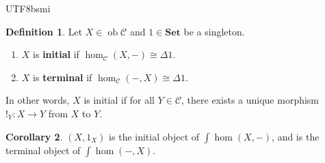 \documentclass[12pt]{article}
\theoremstyle{definition}
\newtheorem{definition}{Definition}[section]
\newtheorem{lemma}[definition]{Lemma}
\newtheorem{corollary}[definition]{Corollary}
\newcommand\<{\langle}
\renewcommand\>{\rangle}
\DeclareMathOperator{\ob}{ob}
\begin{document}
\begin{CJK}{UTF8}{bsmi}

\begin{definition}
    Let $X\in\ob\mathcal{C}$ and $1\in\textbf{Set}$ be a singleton.
    \begin{enumerate}
        \item $X$ is \textbf{initial} if $\hom_\mathcal{C}(X, -)\cong\Delta 1$.
        \item $X$ is \textbf{terminal} if $\hom_\mathcal{C}(-, X)\cong\Delta 1$.
    \end{enumerate}
\end{definition}

In other words, $X$ is initial if for all $Y\in\mathcal{C}$, there exists a unique morphism $!_Y:X\to Y$ from $X$ to $Y$.

\begin{corollary}
    $(X, 1_X)$ is the initial object of $\int\hom(X, -)$, and is the terminal object of $\int\hom(-, X)$.
\end{corollary}



\end{CJK}
\end{document}
